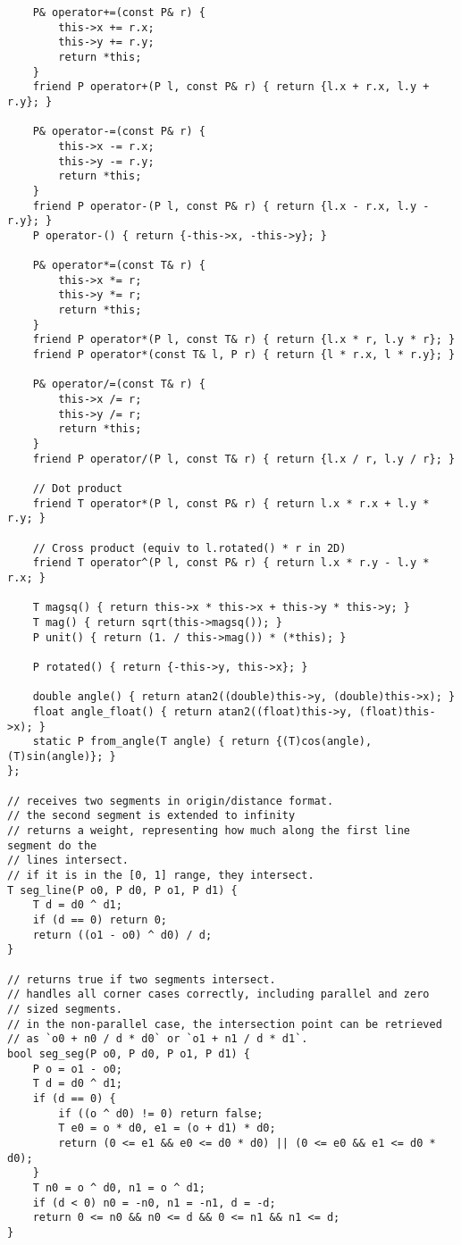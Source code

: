 \documentclass[twoside]{article}
\begin{document}
\begin{multicols*}{2}
\begin{verbatim}
    P& operator+=(const P& r) {
        this->x += r.x;
        this->y += r.y;
        return *this;
    }
    friend P operator+(P l, const P& r) { return {l.x + r.x, l.y + r.y}; }

    P& operator-=(const P& r) {
        this->x -= r.x;
        this->y -= r.y;
        return *this;
    }
    friend P operator-(P l, const P& r) { return {l.x - r.x, l.y - r.y}; }
    P operator-() { return {-this->x, -this->y}; }

    P& operator*=(const T& r) {
        this->x *= r;
        this->y *= r;
        return *this;
    }
    friend P operator*(P l, const T& r) { return {l.x * r, l.y * r}; }
    friend P operator*(const T& l, P r) { return {l * r.x, l * r.y}; }

    P& operator/=(const T& r) {
        this->x /= r;
        this->y /= r;
        return *this;
    }
    friend P operator/(P l, const T& r) { return {l.x / r, l.y / r}; }

    // Dot product
    friend T operator*(P l, const P& r) { return l.x * r.x + l.y * r.y; }

    // Cross product (equiv to l.rotated() * r in 2D)
    friend T operator^(P l, const P& r) { return l.x * r.y - l.y * r.x; }

    T magsq() { return this->x * this->x + this->y * this->y; }
    T mag() { return sqrt(this->magsq()); }
    P unit() { return (1. / this->mag()) * (*this); }

    P rotated() { return {-this->y, this->x}; }

    double angle() { return atan2((double)this->y, (double)this->x); }
    float angle_float() { return atan2((float)this->y, (float)this->x); }
    static P from_angle(T angle) { return {(T)cos(angle), (T)sin(angle)}; }
};

// receives two segments in origin/distance format.
// the second segment is extended to infinity
// returns a weight, representing how much along the first line segment do the
// lines intersect.
// if it is in the [0, 1] range, they intersect.
T seg_line(P o0, P d0, P o1, P d1) {
    T d = d0 ^ d1;
    if (d == 0) return 0;
    return ((o1 - o0) ^ d0) / d;
}

// returns true if two segments intersect.
// handles all corner cases correctly, including parallel and zero
// sized segments.
// in the non-parallel case, the intersection point can be retrieved
// as `o0 + n0 / d * d0` or `o1 + n1 / d * d1`.
bool seg_seg(P o0, P d0, P o1, P d1) {
    P o = o1 - o0;
    T d = d0 ^ d1;
    if (d == 0) {
        if ((o ^ d0) != 0) return false;
        T e0 = o * d0, e1 = (o + d1) * d0;
        return (0 <= e1 && e0 <= d0 * d0) || (0 <= e0 && e1 <= d0 * d0);
    }
    T n0 = o ^ d0, n1 = o ^ d1;
    if (d < 0) n0 = -n0, n1 = -n1, d = -d;
    return 0 <= n0 && n0 <= d && 0 <= n1 && n1 <= d;
}


\end{verbatim}
\end{multicols*}
\end{document}
